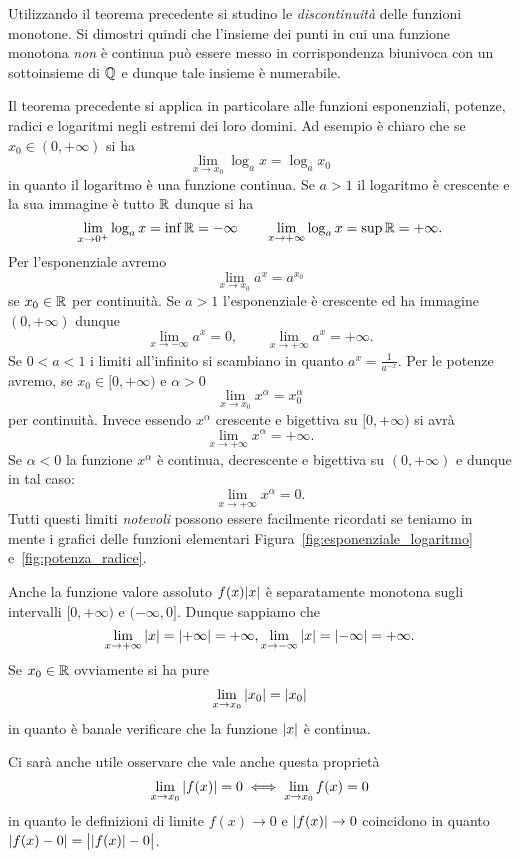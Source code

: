 \begin{exercise}
  Utilizzando il teorema precedente si studino le \emph{discontinuità}
  delle funzioni monotone. 
  Si dimostri quindi che l'insieme dei punti in cui una funzione monotona 
  \emph{non} è continua può essere messo in corrispondenza biunivoca 
  con un sottoinsieme di $\mathbb Q$ e dunque tale insieme è numerabile.
\end{exercise}

Il teorema precedente si applica in particolare alle funzioni 
esponenziali, potenze, radici e logaritmi negli estremi dei loro 
domini. Ad esempio è chiaro che se $x_0\in (0,+\infty)$ 
si ha 
\[
  \lim_{x\to x_0} \log_a x = \log_a x_0
\]
in quanto il logaritmo è una funzione continua. 
Se $a>1$ il logaritmo è crescente e la sua immagine è tutto $\mathbb R$ 
dunque si ha 
\[
  \lim_{x\to 0^+} \log_a x = \inf \mathbb R = -\infty
  \qquad
  \lim_{x\to +\infty} \log_a x = \sup \mathbb R = +\infty.
\]
Per l'esponenziale avremo 
\[
 \lim_{x\to x_0} a^x = a^{x_0}
\]
se $x_0\in \mathbb R$ per continuità. 
Se $a>1$ l'esponenziale è crescente 
ed ha immagine $(0,+\infty)$ dunque 
\[
  \lim_{x\to -\infty} a^x = 0, \qquad 
  \lim_{x\to +\infty} a^x = +\infty.
\]
Se $0<a<1$ i limiti all'infinito 
si scambiano in quanto $a^{x}= \frac{1}{a^{-x}}$.
Per le potenze avremo, se $x_0\in[0,+\infty)$ e $\alpha>0$
\[
  \lim_{x\to x_0} x^\alpha = x_0^\alpha
\]
per continuità. Invece essendo $x^\alpha$ crescente e bigettiva 
su $[0,+\infty)$ si avrà 
\[
  \lim_{x\to +\infty} x^\alpha = +\infty.
\]
Se $\alpha<0$ la funzione $x^\alpha$ è continua, decrescente e bigettiva 
su $(0,+\infty)$ e dunque in tal caso:
\[
  \lim_{x\to +\infty} x^\alpha = 0.
\]
Tutti questi limiti \emph{notevoli} possono essere facilmente 
ricordati se teniamo in mente i grafici delle funzioni elementari
Figura~\ref{fig:esponenziale_logaritmo} e~\ref{fig:potenza_radice}.

Anche la funzione valore assoluto $f(x){\left|x\right|}$ è separatamente 
monotona sugli intervalli $[0,+\infty)$ e $(-\infty,0]$. 
Dunque sappiamo che 
\[
  \lim_{x\to +\infty} {\left|x\right|} = {\left|+\infty\right|} = +\infty, 
  \lim_{x\to -\infty} {\left|x\right|} = {\left|-\infty\right|} = +\infty.
\]
Se $x_0\in \mathbb R$ ovviamente si ha pure
\[
  \lim_{x\to x_0} {\left|x_0\right|} = {\left|x_0\right|}
\]
in quanto è banale verificare che la funzione ${\left|x\right|}$ è continua.

Ci sarà anche utile osservare che vale anche questa proprietà 
\[
\lim_{x\to x_0} {\left|f(x)\right|} = 0 \iff 
\lim_{x\to x_0} f(x) = 0
\]
in quanto le definizioni di limite $f(x)\to 0$ e ${\left|f(x)\right|}\to 0$ 
coincidono in quanto ${\left|f(x)-0\right|} = \big\lvert{{\left|f(x)\right|} - 0}\big\rvert$.


